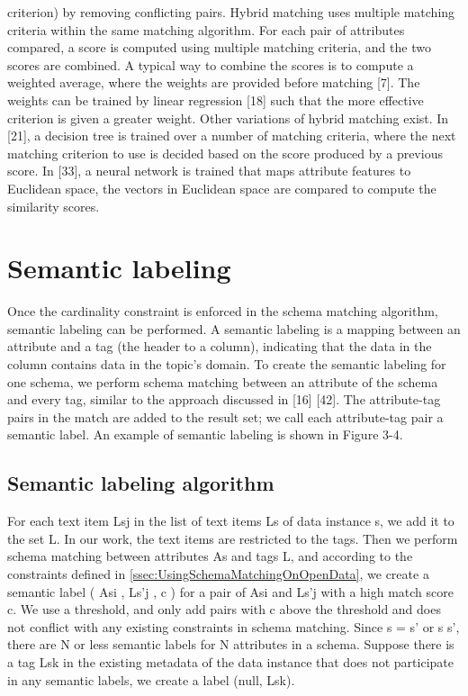 criterion) by removing conflicting pairs. Hybrid matching uses multiple matching criteria within the same matching algorithm. For each pair of attributes compared, a score is computed using multiple matching criteria, and the two scores are combined. A typical way to combine the scores is to compute a weighted average, where the weights are provided before matching [7]. The weights can be trained by linear regression [18] such that the more effective criterion is given a greater weight. Other variations of hybrid matching exist. In [21], a decision tree is trained over a number of matching criteria, where the next matching criterion to use is decided based on the score produced by a previous score. In [33], a neural network is trained that maps attribute features to Euclidean space, the vectors in Euclidean space are compared to compute the similarity scores.

\section{Semantic labeling}
\label{sec:SemanticLabeling}

Once the cardinality constraint is enforced in the schema matching algorithm, semantic labeling can be performed. A semantic labeling is a mapping between an attribute and a tag (the header to a column), indicating that the data in the column contains data in the topic's domain. To create the semantic labeling for one schema, we perform schema matching between an attribute of the schema and every tag, similar to the approach discussed in [16] [42]. The attribute-tag pairs in the match are added to the result set; we call each attribute-tag pair a semantic label. An example of semantic labeling is shown in Figure 3-4.

\subsection{Semantic labeling algorithm}
\label{ssec:SemanticLabelingAlgorithm}

For each text item Lsj in the list of text items Ls of data instance s, we add it to the set L. In our work, the text items are restricted to the tags. Then we perform schema matching between attributes As and tags L, and according to the constraints defined in \autoref{ssec:UsingSchemaMatchingOnOpenData}, we create a semantic label ( Asi , Ls'j , c ) for a pair of Asi and Ls'j with a high match score c. We use a threshold, and only add pairs with c above the threshold and does not conflict with any existing constraints in schema matching. Since s = s' or s s', there are N or less semantic labels for N attributes in a schema.
Suppose there is a tag Lsk in the existing metadata of the data instance that does not participate in any semantic labels, we create a label (null, Lsk).

